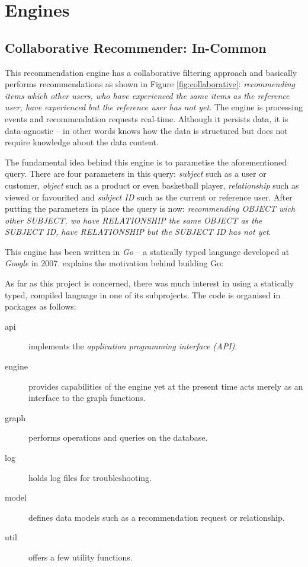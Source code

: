 \section{Engines}

\subsection{Collaborative Recommender: In-Common}

This recommendation engine has a collaborative filtering approach and basically performs recommendations as shown in Figure \ref{fig:collaborative}: \emph{recommending items which other users, who have experienced the same items as the reference user, have experienced but the reference user has not yet}. The engine is processing events and recommendation requests real-time. Although it persists data, it is data-agnostic -- in other words knows how the data is structured but does not require knowledge about the data content.

The fundamental idea behind this engine is to parametise the aforementioned query. There are four parameters in this query: \emph{subject} such as a user or customer, \emph{object} such as a product or even basketball player, \emph{relationship} such as viewed or favourited and \emph{subject ID} such as the current or reference user. After putting the parameters in place the query is now: \emph{recommending OBJECT wich other SUBJECT, wo have RELATIONSHIP the same OBJECT as the SUBJECT ID, have RELATIONSHIP but the SUBJECT ID has not yet}.

This engine has been written in \emph{Go} -- a statically typed language developed at \emph{Google} in 2007. \citet{pike12} explains the motivation behind building Go:


As far as this project is concerned, there was much interest in using a statically typed, compiled language in one of its subprojects. The code is organised in packages as follows:

\begin{description}
    \item[api] implements the \emph{application programming interface (API)}.
    \item[engine] provides capabilities of the engine yet at the present time acts merely as an interface to the graph functions.
    \item[graph] performs operations and queries on the database.
    \item[log] holds log files for troubleshooting.
    \item[model] defines data models such as a recommendation request or relationship.
    \item[util] offers a few utility functions.
\end{description}

